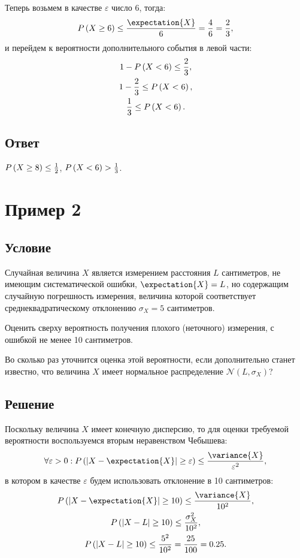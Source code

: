 \documentclass[a4paper,12pt]{article}
\begin{document}
    Теперь возьмем в качестве $\varepsilon$ число 6, тогда:
    \begin{equation}
        \probability{X \ge 6} \le \frac{\expectation{X}}{6} = \frac{4}{6} = \frac{2}{3} ,
    \end{equation}
    и перейдем к вероятности дополнительного события в левой части:
    \begin{gather}
        1 - P \left ( X < 6 \right ) \le \frac{2}{3} , \\
        1 - \frac{2}{3} \le P \left ( X < 6 \right ) , \\
        \frac{1}{3} \le P \left ( X < 6 \right ) .
    \end{gather}

    \subsection*{Ответ}
    $P \left ( X \ge 8 \right ) \le \frac{1}{2}$, $P \left ( X < 6 \right ) > \frac{1}{3}$.


    \section{Пример 2}

    \subsection*{Условие}
    Случайная величина $X$ является измерением расстояния $L$ сантиметров, не имеющим систематической ошибки, $\expectation{X} = L$, но содержащим случайную погрешность
    измерения, величина которой соответствует среднеквадратическому отклонению $\sigma_X = 5$ сантиметров.

    Оценить сверху вероятность получения плохого (неточного) измерения, с ошибкой не менее 10 сантиметров.

    Во сколько раз уточнится оценка этой вероятности, если дополнительно станет известно, что величина $X$ имеет нормальное распределение $\mathcal{N} ( L, \sigma_X)$?

    \subsection*{Решение}
    Поскольку величина $X$ имеет конечную дисперсию, то для оценки требуемой вероятности воспользуемся вторым неравенством Чебышева:
    \begin{equation}
        \forall \varepsilon > 0 : \probability{ \modulus{X - \expectation{X}} \ge \varepsilon } \le \frac{\variance{X}}{\varepsilon^2} ,
    \end{equation}
    в котором в качестве $\varepsilon$ будем использовать отклонение в 10 сантиметров:
    \begin{gather}
        \probability{ \modulus{X - \expectation{X}} \ge 10 } \le \frac{\variance{X}}{10^2} , \\
        \probability{ \modulus{X - L} \ge 10 } \le \frac{\sigma_X^2}{10^2} , \\
        \probability{ \modulus{X - L} \ge 10 } \le \frac{5^2}{10^2} = \frac{25}{100} = 0.25 \label{2:bound}.
    \end{gather}
\end{document}
